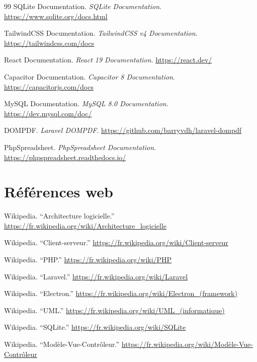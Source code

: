 \documentclass[12pt,a4paper,twoside]{report}
\begin{document}
\begin{thebibliography}{99}
SQLite Documentation. \textit{SQLite Documentation}. \url{https://www.sqlite.org/docs.html}

TailwindCSS Documentation. \textit{TailwindCSS v4 Documentation}. \url{https://tailwindcss.com/docs}

React Documentation. \textit{React 19 Documentation}. \url{https://react.dev/}

Capacitor Documentation. \textit{Capacitor 8 Documentation}. \url{https://capacitorjs.com/docs}

MySQL Documentation. \textit{MySQL 8.0 Documentation}. \url{https://dev.mysql.com/doc/}

DOMPDF. \textit{Laravel DOMPDF}. \url{https://github.com/barryvdh/laravel-dompdf}

PhpSpreadsheet. \textit{PhpSpreadsheet Documentation}. \url{https://phpspreadsheet.readthedocs.io/}

\section*{Références web}

Wikipedia. ``Architecture logicielle.'' \url{https://fr.wikipedia.org/wiki/Architecture_logicielle}

Wikipedia. ``Client-serveur.'' \url{https://fr.wikipedia.org/wiki/Client-serveur}

Wikipedia. ``PHP.'' \url{https://fr.wikipedia.org/wiki/PHP}

Wikipedia. ``Laravel.'' \url{https://fr.wikipedia.org/wiki/Laravel}

Wikipedia. ``Electron.'' \url{https://fr.wikipedia.org/wiki/Electron_(framework)}

Wikipedia. ``UML.'' \url{https://fr.wikipedia.org/wiki/UML_(informatique)}

Wikipedia. ``SQLite.'' \url{https://fr.wikipedia.org/wiki/SQLite}

Wikipedia. ``Modèle-Vue-Contrôleur.'' \url{https://fr.wikipedia.org/wiki/Modèle-Vue-Contrôleur}

\end{thebibliography}

\appendix
\end{document}
